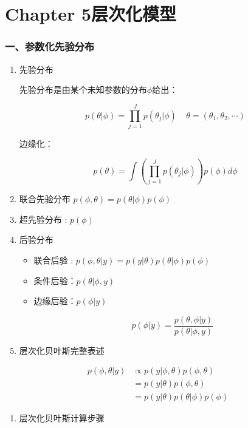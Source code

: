 \section{Chapter 5层次化模型}

\subsubsection{一、参数化先验分布}
\begin{enumerate}
\def\labelenumi{\arabic{enumi}.}
\item
  先验分布

  先验分布是由某个未知参数的分布\(\phi\)给出：

  \[p(\theta|\phi)=\prod_{j=1}^Jp(\theta_j|\phi)\ \ \ \ \  \theta=(\theta_1,\theta_2,\cdots)\]

  边缘化：

  \[p(\theta)=\int\left( \prod_{j=1}^Jp(\theta_j|\phi) \right)p(\phi)d\phi\]
\item
  联合先验分布 \(p(\phi,\theta)=p(\theta|\phi)p(\phi)\)
\item
  超先验分布 : \(p(\phi)\)
\item
  后验分布

  \begin{itemize}
  \item
    联合后验 : \(p(\phi,\theta|y)=p(y|\theta)p(\theta|\phi)p(\phi)\)
  \item
    条件后验：\(p(\theta|\phi,y)\)
  \item
    边缘后验：\(p(\phi|y)\)

    \[p(\phi|y)=\frac{p(\theta,\phi|y)}{p(\theta|\phi,y)}\]
  \end{itemize}
\item
  层次化贝叶斯完整表述
\end{enumerate}

\begin{equation}
  \begin{aligned}
    p(\phi,\theta|y)
    &\propto p(y|\phi,\theta)p(\phi,\theta)\\
    &=p(y|\theta)p(\phi,\theta)\\
    &=p(y|\theta)p(\theta|\phi)p(\phi)
    \end{aligned}
\end{equation}


\begin{enumerate}
\def\labelenumi{\arabic{enumi}.}
\item
  层次化贝叶斯计算步骤
\end{enumerate}

